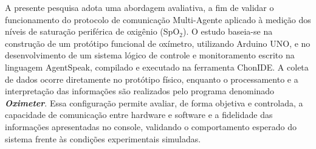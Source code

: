 

A presente pesquisa adota uma abordagem avaliativa, a fim de validar o funcionamento do protocolo de comunicação Multi-Agente aplicado à medição dos níveis de saturação periférica de oxigênio (SpO$_2$). O estudo baseia-se na construção de um protótipo funcional de oxímetro, utilizando Arduino UNO, e no desenvolvimento de um sistema lógico de controle e monitoramento escrito na linguagem AgentSpeak, compilado e executado na ferramenta ChonIDE. A coleta de dados ocorre diretamente no protótipo físico, enquanto o processamento e a interpretação das informações são realizados pelo programa denominado \textit{\textbf{Oximeter}}. Essa configuração permite avaliar, de forma objetiva e controlada, a capacidade de comunicação entre hardware e software e a fidelidade das informações apresentadas no console, validando o comportamento esperado do sistema frente às condições experimentais simuladas.